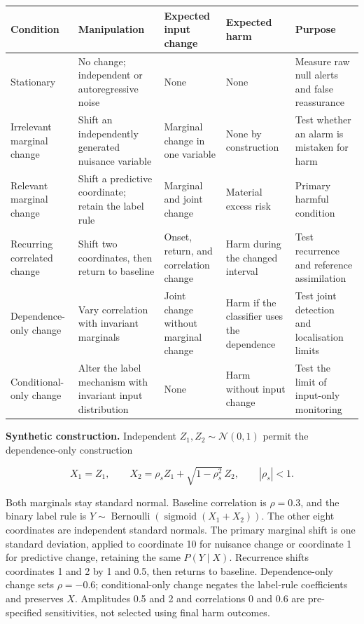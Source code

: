 \documentclass[
]{article}
\begin{document}
\begin{longtable}[]{@{}
  >{\raggedright\arraybackslash}p{}
  >{\raggedright\arraybackslash}p{}
  >{\raggedright\arraybackslash}p{}
  >{\raggedright\arraybackslash}p{}
  >{\raggedright\arraybackslash}p{}@{}}
\toprule
Condition & Manipulation & Expected input change & Expected harm &
Purpose \\
\midrule
\endhead
Stationary & No change; independent or autoregressive noise & None &
None & Measure raw null alerts and false reassurance \\
Irrelevant marginal change & Shift an independently generated nuisance
variable & Marginal change in one variable & None by construction & Test
whether an alarm is mistaken for harm \\
Relevant marginal change & Shift a predictive coordinate; retain the
label rule & Marginal and joint change & Material excess risk & Primary
harmful condition \\
Recurring correlated change & Shift two coordinates, then return to
baseline & Onset, return, and correlation change & Harm during the
changed interval & Test recurrence and reference assimilation \\
Dependence-only change & Vary correlation with invariant marginals &
Joint change without marginal change & Harm if the classifier uses the
dependence & Test joint detection and localisation limits \\
Conditional-only change & Alter the label mechanism with invariant input
distribution & None & Harm without input change & Test the limit of
input-only monitoring \\
\bottomrule
\end{longtable}

\textbf{Synthetic construction.} Independent
\(Z_1,Z_2\sim\mathcal{N}(0,1)\) permit the dependence-only construction

\[
X_1=Z_1,
\qquad
X_2=\rho_s Z_1+\sqrt{1-\rho_s^2}\,Z_2,
\qquad
|\rho_s|<1.
\]

Both marginals stay standard normal. Baseline correlation is
\(\rho=0.3\), and the binary label rule is
\(Y\sim\operatorname{Bernoulli}(\operatorname{sigmoid}(X_1+X_2))\). The
other eight coordinates are independent standard normals. The primary
marginal shift is one standard deviation, applied to coordinate 10 for
nuisance change or coordinate 1 for predictive change, retaining the
same \(P(Y\mid X)\). Recurrence shifts coordinates 1 and 2 by 1 and 0.5,
then returns to baseline. Dependence-only change sets \(\rho=-0.6\);
conditional-only change negates the label-rule coefficients and
preserves \(X\). Amplitudes 0.5 and 2 and correlations 0 and 0.6 are
pre-specified sensitivities, not selected using final harm outcomes.
\end{document}
